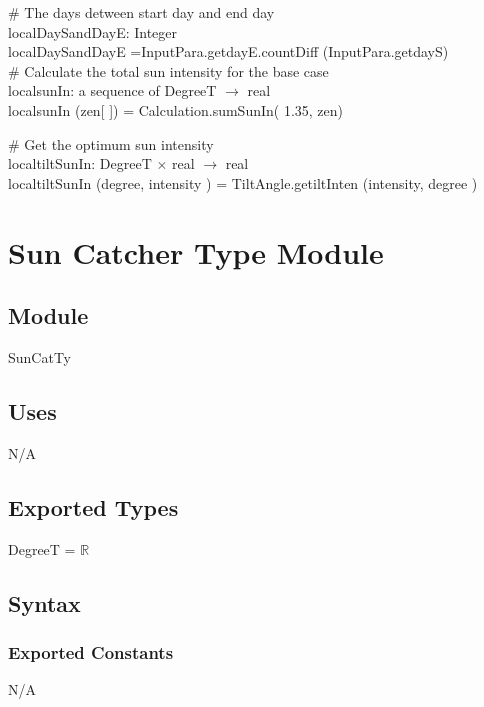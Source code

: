 \documentclass[12pt, titlepage]{article}
\begin{document}
$\#$ The days detween start day and end day\\
localDaySandDayE: Integer\\
localDaySandDayE =InputPara.getdayE.countDiff (InputPara.getdayS)\\

$\#$ Calculate the total sun intensity for the base case\\
localsunIn: a sequence of DegreeT $\rightarrow$ real\\
localsunIn (zen[ ]) = Calculation.sumSunIn( 1.35, zen)

$\#$ Get the optimum sun intensity\\
localtiltSunIn: DegreeT $\times$ real $\rightarrow$ real\\
localtiltSunIn (degree, intensity ) = TiltAngle.getiltInten (intensity, degree )




\newpage

\section{Sun Catcher Type Module} \label{ModuleSCTM} 

\subsection{Module}
SunCatTy

\subsection{Uses}

N/A\\

\subsection{Exported Types}

DegreeT = $\mathbb{R}$\\

\subsection{Syntax}

\subsubsection{Exported Constants}
N/A\\
\end{document}
